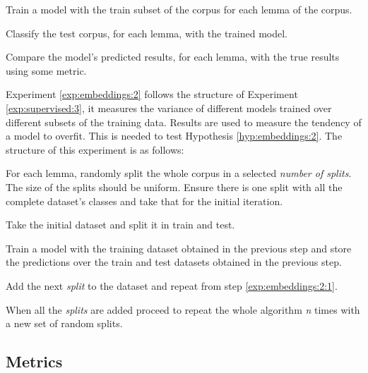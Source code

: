 \begin{experiment}\label{exp:embeddings:1}
  \begin{enumexp}
    \item Train a model with the train subset of the corpus for each lemma of
      the corpus.
    \item Classify the test corpus, for each lemma, with the trained model.
    \item Compare the model's predicted results, for each lemma, with the true
      results using some metric.
  \end{enumexp}
\end{experiment}

Experiment \ref{exp:embeddings:2} follows the structure of Experiment
\ref{exp:supervised:3}, it measures the variance of different models trained
over different subsets of the training data. Results are used to
measure the tendency of a model to overfit. This is needed to test Hypothesis
\ref{hyp:embeddings:2}. The structure of this experiment is as follows:

\begin{experiment}\label{exp:embeddings:2}
  \begin{enumexp}
    \item For each lemma, randomly split the whole corpus in a selected {\em
      number of splits}. The size of the splits should be uniform. Ensure there
      is one split with all the complete dataset's classes and take that for
      the initial iteration.
    \item \label{exp:embeddings:2:1} Take the initial dataset and split it
      in train and test.
    \item Train a model with the training dataset obtained in the previous step
      and store the predictions over the train and test datasets obtained in
      the previous step.
    \item Add the next {\em split} to the dataset and repeat from step
      \ref{exp:embeddings:2:1}.
    \item When all the {\em splits} are added proceed to repeat the whole
      algorithm {\em n} times with a new set of random splits.
  \end{enumexp}
\end{experiment}

\subsection{Metrics}\label{sec:embeddings:metrics}

